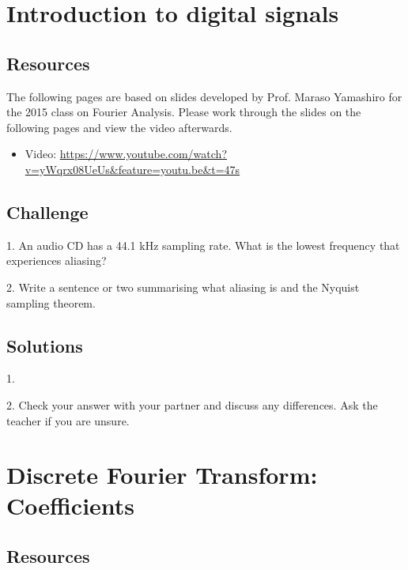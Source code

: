 \section{Introduction to digital signals}

\subsection*{Resources}

The following pages are based on slides developed by Prof. Maraso Yamashiro for the 2015 class on Fourier Analysis. Please work through the slides on the following pages and view the video afterwards.



\begin{itemize}
    \item Video: \url{https://www.youtube.com/watch?v=yWqrx08UeUs&feature=youtu.be&t=47s}
\end{itemize}

\subsection*{Challenge}
1. An audio CD has a 44.1 kHz sampling rate. What is the lowest frequency that experiences aliasing?

2. Write a sentence or two summarising what aliasing is and the Nyquist sampling theorem.

\subsection*{Solutions}
1.\\

2. Check your answer with your partner and discuss any differences. Ask the teacher if you are unsure.





\newpage
\section{Discrete Fourier Transform: Coefficients}

\subsection*{Resources}

